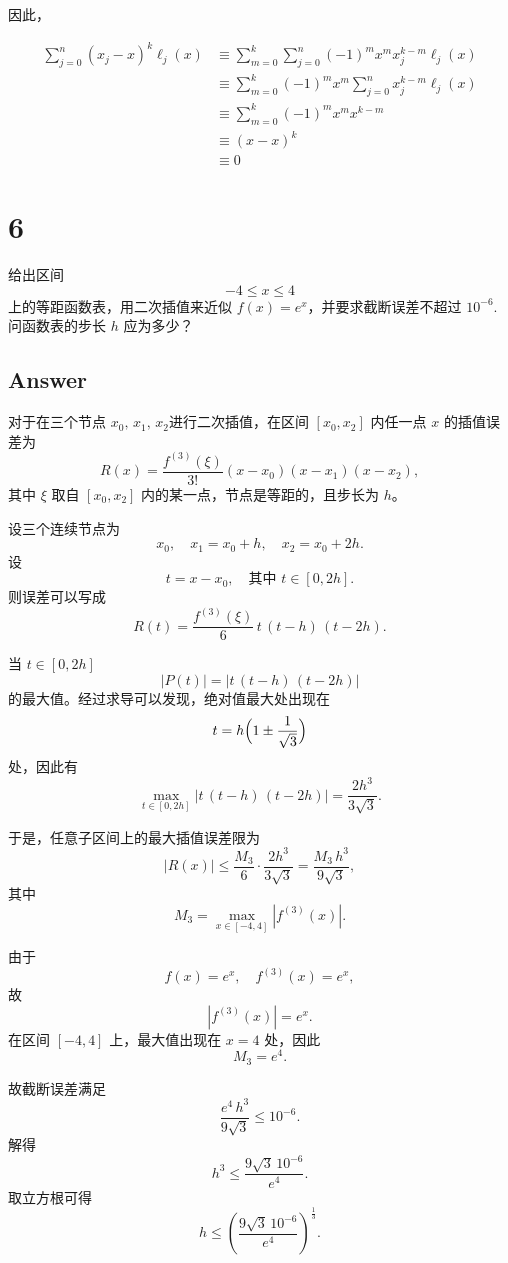 \documentclass[11pt]{article}
\begin{document}
因此，

\[
\begin{aligned}
\sum_{j = 0}^n(x_j - x)^k\ell_j(x)&\equiv
\sum_{m = 0}^k\sum_{j = 0}^n(-1)^mx^mx_j^{k - m}\ell_j(x) \\ &\equiv
\sum_{m = 0}^k(-1)^mx^m\sum_{j = 0}^nx_j^{k - m}\ell_j(x)\\ &\equiv
\sum_{m = 0}^k (-1)^mx^mx^{k-m} \\ &\equiv 
(x - x)^k \\ &\equiv 
0
\end{aligned}
\]

    \section{6}\label{section}

给出区间 \[
-4 \le x \le 4
\] 上的等距函数表，用二次插值来近似 \(f(x)=e^x\)，并要求截断误差不超过
\(10^{-6}.\) 问函数表的步长 \(h\) 应为多少？

\subsection{Answer}\label{answer}

对于在三个节点 \(x_0,\, x_1,\, x_2\)进行二次插值，在区间 \([x_0,x_2]\)
内任一点 \(x\) 的插值误差为 \[
R(x)=\frac{f^{(3)}(\xi)}{3!}(x-x_0)(x-x_1)(x-x_2),
\] 其中 \(\xi\) 取自 \([x_0,x_2]\) 内的某一点，节点是等距的，且步长为
\(h\)。

设三个连续节点为 \[
x_0,\quad x_1=x_0+h,\quad x_2=x_0+2h.
\] 设 \[
t=x-x_0,\quad \text{其中 } t\in[0,2h].
\] 则误差可以写成 \[
R(t)=\frac{f^{(3)}(\xi)}{6}\, t\,(t-h)\,(t-2h).
\]

当 \(t\in[0,2h]\) \[
|P(t)|=|t\,(t-h)\,(t-2h)|
\] 的最大值。经过求导可以发现，绝对值最大处出现在 \[
t = h\Bigl(1\pm \frac{1}{\sqrt{3}}\Bigr)
\] 处，因此有 \[
\max_{t\in[0,2h]}|t\,(t-h)\,(t-2h)| = \frac{2h^3}{3\sqrt{3}}.
\]

于是，任意子区间上的最大插值误差限为 \[
|R(x)| \le \frac{M_3}{6} \cdot \frac{2h^3}{3\sqrt{3}} = \frac{M_3\, h^3}{9\sqrt{3}},
\] 其中 \[
M_3 = \max_{x\in[-4,4]}|f^{(3)}(x)|.
\]

由于 \[
f(x)=e^x,\quad f^{(3)}(x)=e^x,
\] 故 \[
|f^{(3)}(x)|= e^x.
\] 在区间 \([-4,4]\) 上，最大值出现在 \(x=4\) 处，因此 \[
M_3 = e^4.
\]

故截断误差满足 \[
\frac{e^4\, h^3}{9\sqrt{3}} \le 10^{-6}.
\] 解得 \[
h^3 \le \frac{9\sqrt{3}\,10^{-6}}{e^4}.
\] 取立方根可得 \[
\boxed{
h \le \left(\frac{9\sqrt{3}\,10^{-6}}{e^4}\right)^{\frac{1}{3}}.
}
\]
\end{document}
